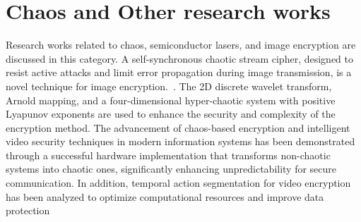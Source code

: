 \section{Chaos and Other research works}\label{Sec:ReviewTopicOthers}
Research works related to chaos, semiconductor lasers, and image encryption are discussed in this category. 
A self-synchronous chaotic stream cipher, designed to resist active attacks and limit error propagation during image transmission, is a novel technique for image encryption.~\cite{Fan2018}. The 2D discrete wavelet transform, Arnold mapping, and a four-dimensional hyper-chaotic system with positive Lyapunov exponents are used to enhance the security and complexity of the encryption method. The advancement of chaos-based encryption and intelligent video security techniques in modern information systems has been demonstrated through a successful hardware implementation that transforms non-chaotic systems into chaotic ones, significantly enhancing unpredictability for secure communication. In addition, temporal action segmentation for video encryption has been analyzed to optimize computational resources and improve data protection~\cite{Liu2024k,Gao2024}
